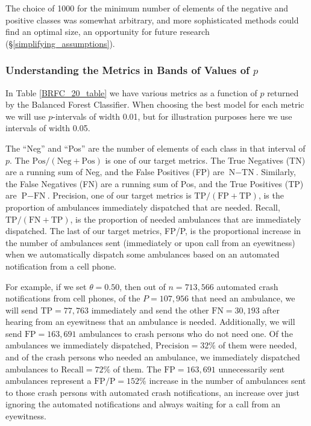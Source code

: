 The choice of 1000 for the minimum number of elements of the negative and positive classes was somewhat arbitrary, and more sophisticated methods could find an optimal size, an opportunity for future research (\S\ref{simplifying_assumptions}).



\subsubsection{Understanding the Metrics in Bands of Values of $p$}
\label{understand_bands}

In Table \ref{BRFC_20_table} we have various metrics as a function of $p$ returned by the Balanced Forest Classifier.  When choosing the best model for each metric we will use $p$-intervals of width 0.01, but for illustration purposes here we use intervals of width 0.05.  

The ``Neg'' and ``Pos'' are the number of elements of each class in that interval of $p$.  The $\text{Pos}/( \text{Neg} + \text{Pos})$ is one of our target metrics.  The True Negatives (TN) are a running sum of Neg, and the False Positives (FP) are $\text{N} - \text{TN}$.  Similarly, the False Negatives (FN) are a running sum of Pos, and the True Positives (TP) are $\text{P} - \text{FN}$.  Precision, one of our target metrics is $\text{TP}/(\text{FP} + \text{TP})$, is the proportion of ambulances immediately dispatched that are needed.  Recall, $\text{TP}/(\text{FN} + \text{TP})$, is the proportion of needed ambulances that are immediately dispatched. The last of our target metrics, FP/P, is the proportional increase in the number of ambulances sent (immediately or upon call from an eyewitness) when we automatically dispatch some ambulances based on an automated notification from a cell phone.  

For example, if we set $\theta = 0.50$, then out of $n = 713,566$ automated crash notifications from cell phones, of the $P=107,956$ that need an ambulance, we will send $\text{TP} = 77,763$  immediately and send the other $\text{FN} = 30,193$ after hearing from an eyewitness that an ambulance is needed.  Additionally, we will send $\text{FP} = 163,691$ ambulances to crash persons who do not need one.  Of the ambulances we immediately dispatched, $\text{Precision} = 32\%$ of them were needed, and of the crash persons who needed an ambulance, we immediately dispatched ambulances to $\text{Recall} = 72\%$ of them.  The $\text{FP} = 163,691$ unnecessarily sent ambulances represent a $\text{FP}/\text{P} = 152\%$ increase in the number of ambulances sent to those crash persons with automated crash notifications, an increase over just ignoring the automated notifications and always waiting for a call from an eyewitness.

